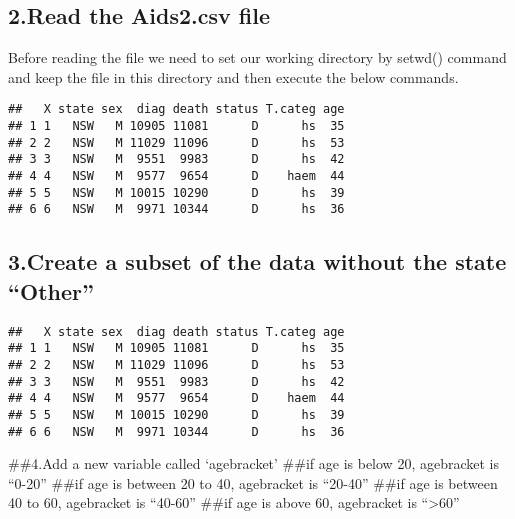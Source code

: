 \documentclass[
]{article}
\begin{document}
\hypertarget{read-the-aids2.csv-file}{%
\subsection{2.Read the Aids2.csv file}\label{read-the-aids2.csv-file}}

Before reading the file we need to set our working directory by setwd()
command and keep the file in this directory and then execute the below
commands.

\begin{verbatim}
##   X state sex  diag death status T.categ age
## 1 1   NSW   M 10905 11081      D      hs  35
## 2 2   NSW   M 11029 11096      D      hs  53
## 3 3   NSW   M  9551  9983      D      hs  42
## 4 4   NSW   M  9577  9654      D    haem  44
## 5 5   NSW   M 10015 10290      D      hs  39
## 6 6   NSW   M  9971 10344      D      hs  36
\end{verbatim}

\hypertarget{create-a-subset-of-the-data-without-the-state-other}{%
\subsection{3.Create a subset of the data without the state
``Other''}\label{create-a-subset-of-the-data-without-the-state-other}}

\begin{verbatim}
##   X state sex  diag death status T.categ age
## 1 1   NSW   M 10905 11081      D      hs  35
## 2 2   NSW   M 11029 11096      D      hs  53
## 3 3   NSW   M  9551  9983      D      hs  42
## 4 4   NSW   M  9577  9654      D    haem  44
## 5 5   NSW   M 10015 10290      D      hs  39
## 6 6   NSW   M  9971 10344      D      hs  36
\end{verbatim}

\#\#4.Add a new variable called `agebracket' \#\#if age is below 20,
agebracket is ``0-20'' \#\#if age is between 20 to 40, agebracket is
``20-40'' \#\#if age is between 40 to 60, agebracket is ``40-60'' \#\#if
age is above 60, agebracket is ``\textgreater60''
\end{document}
